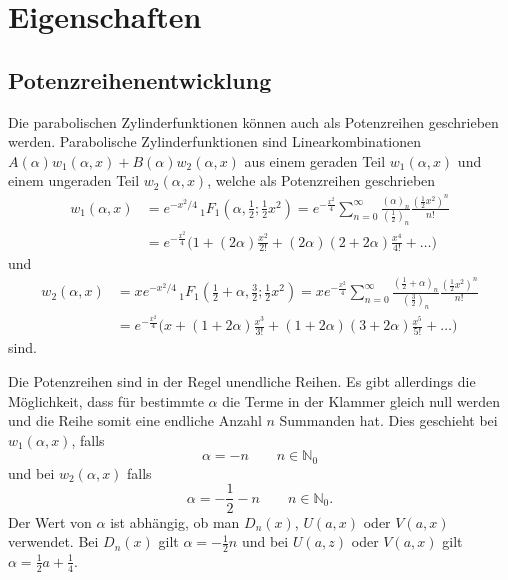 %
%
%
\section{Eigenschaften
	\label{parzyl:section:Eigenschaften}}

\subsection{Potenzreihenentwicklung
	\label{parzyl:potenz}}
Die parabolischen Zylinderfunktionen können auch als Potenzreihen
geschrieben werden.
Parabolische Zylinderfunktionen sind Linearkombinationen 
$A(\alpha)w_1(\alpha, x) + B(\alpha)w_2(\alpha, x)$ aus einem geraden Teil
$w_1(\alpha, x)$ 
und einem ungeraden Teil $w_2(\alpha, x)$, welche als Potenzreihen geschrieben
\begin{align}
	w_1(\alpha,x)
	&=  
	e^{-x^2/4} \,
	{}_{1} F_{1}
	(
	\alpha, {\textstyle \frac{1}{2}} ; {\textstyle \frac{1}{2}}x^2) 
	= 
	e^{-\frac{x^2}{4}}
	\sum^{\infty}_{n=0}
	\frac{( \alpha )_{n}}{(\frac{1}{2})_{n}}
	\frac{(\frac{1}{2} x^2)^n}{n!} \\
	&=
	e^{-\frac{x^2}{4}}
	\biggl ( 
	1 
	+
	( 2\alpha )\frac{x^2}{2!}
	+
	( 2\alpha ) ( 2 + 2\alpha )\frac{x^4}{4!}  
	+
	\dots
	\biggr )
\end{align}
und
\begin{align}
	w_2(\alpha,x)
	&=  
	xe^{-x^2/4} \,
	{}_{1} F_{1}
	(
	{\textstyle \frac{1}{2}} 
	+ \alpha, {\textstyle \frac{3}{2}} ; {\textstyle \frac{1}{2}}x^2) 
	= 
	xe^{-\frac{x^2}{4}}
	\sum^{\infty}_{n=0}
	\frac{( \frac{1}{2} + \alpha )_{n}}{( \frac{3}{2})_{n}}
	\frac{( \frac{1}{2} x^2)^n}{n!} \\
	&=
	e^{-\frac{x^2}{4}}
	\biggl ( 
	x 
	+
	( 1 + 2\alpha )\frac{x^3}{3!}
	+
	( 1 + 2\alpha )( 3 + 2\alpha )\frac{x^5}{5!}  
	+
	\dots
	\biggr )
\end{align}
sind.

Die Potenzreihen sind in der Regel unendliche Reihen. 
Es gibt allerdings die Möglichkeit, dass für bestimmte $\alpha$ die Terme in der Klammer gleich null werden 
und die Reihe somit eine endliche Anzahl $n$ Summanden hat.
Dies geschieht bei $w_1(\alpha,x)$, falls
\begin{equation}
	\alpha =  -n \qquad n \in \mathbb{N}_0
\end{equation}
und bei $w_2(\alpha,x)$ falls
\begin{equation}
	\alpha = -\frac{1}{2} - n \qquad n \in \mathbb{N}_0.
\end{equation}
Der Wert von $\alpha$ ist abhängig, ob man $D_n(x)$, $U(a,x)$ oder $V(a,x)$ verwendet.
Bei $D_n(x)$ gilt $\alpha = -{\textstyle \frac{1}{2}} n$ und bei $U(a,z)$ oder $V(a,x)$ gilt 
$\alpha = {\textstyle \frac{1}{2}} a + {\textstyle \frac{1}{4}}$.


